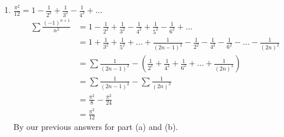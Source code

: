 \documentclass[12pt,letterpaper]{article}
\theoremstyle{case}
\theoremstyle{definition}
\begin{document}
\begin{enumerate}
\begin{enumerate}
			\item $\displaystyle \frac{\pi^2}{12} = 1 -\frac{1}{2^2}+\frac{1}{3^2} - \frac{1}{4^2} + \dots$
			\begin{align*}
				\sum \frac{(-1)^{n+1}}{n^2} &= 1-\frac{1}{2^2}+\frac{1}{3^2}-\frac{1}{4^2}+\frac{1}{5^2}-\frac{1}{6^2}+\dots \\
				&= 1+\frac{1}{3^2}+\frac{1}{5^2}+\dots+\frac{1}{(2n-1)^2} -\frac{1}{2^2}-\frac{1}{4^2}-\frac{1}{6^2}-\dots-\frac{1}{(2n)^2} \\
				&= \sum \frac{1}{(2n-1)^2} -\left(\frac{1}{2^1}+\frac{1}{4^2}+\frac{1}{6^2}+\dots+\frac{1}{(2n)^2}\right) \\
				&= \sum \frac{1}{(2n-1)^2} - \sum \frac{1}{(2n)^2} \\
				&= \frac{\pi^2}{8} -\frac{\pi^2}{24} \\
				&= \frac{\pi^2}{12}
			\end{align*}
			By our previous answers for part (a) and (b).
		\end{enumerate}
	\end{enumerate}
\end{document}
